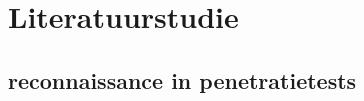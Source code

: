 








\section{Literatuurstudie}%
\label{sec:literatuurstudie}

\subsection{reconnaissance in penetratietests}

